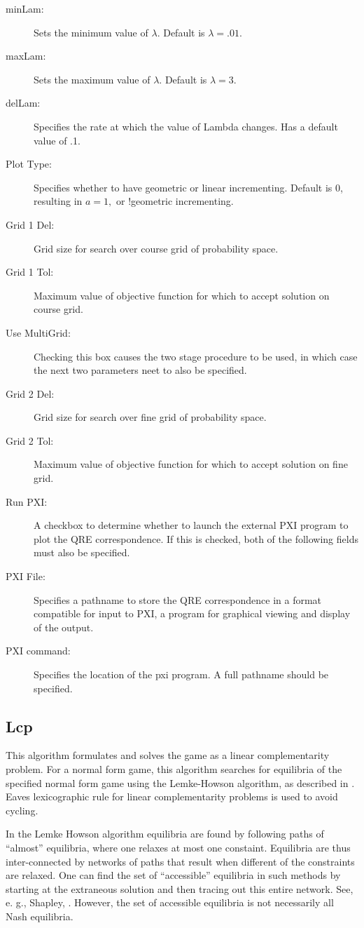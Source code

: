 \begin{description}
\item[minLam:] Sets the minimum value of $\lambda.$
Default is $\lambda = .01.$
\item[maxLam:]  Sets the maximum value of $\lambda.$
Default is $\lambda = 3.$ 
\item[delLam:] Specifies the rate at which the value of Lambda changes.
Has a default value of .1.
\item[Plot Type:] Specifies whether to have geometric or linear incrementing.
Default is 0, resulting in $a = 1,$ or !geometric incrementing.
\item[Grid 1 Del:] Grid size for search over course grid of probability space.
\item[Grid 1 Tol:] Maximum value of objective function for which to accept
solution on course grid.
\item[Use MultiGrid:] Checking this box causes the two stage procedure
to be used, in which case the next two parameters neet to also be
specified.
\item[Grid 2 Del:] Grid size for search over fine grid of probability space.  
\item[Grid 2 Tol:] Maximum value of objective function for which to
accept solution on fine grid.
\item[Run PXI:] A checkbox to determine whether to launch the external
PXI program to plot the QRE correspondence.  If this is checked, both
of the following fields must also be specified.
\item[PXI File:] Specifies a pathname to store the QRE correspondence
in a format compatible for input to PXI, a program for graphical
viewing and display of the output.
\item[PXI command:] Specifies the location of the pxi program.  A full
pathname should be specified.
\end{description}

\subsection{Lcp}\label{Lcp}
This algorithm formulates and solves the game as a linear
complementarity problem.  For a normal form game, this algorithm
searches for equilibria of the specified normal form game using the
Lemke-Howson algorithm, as described in \cite{LemHow:64}. Eaves
\cite{Eav:71} lexicographic rule for linear complementarity problems
is used to avoid cycling.

In the Lemke Howson algorithm equilibria are found by following paths
of ``almost'' equilibria, where one relaxes at most one constaint.
Equilibria are thus inter-connected by networks of paths that result
when different of the constraints are relaxed.  One can find the set
of ``accessible'' equilibria in such methods by starting at the
extraneous solution and then tracing out this entire network.  See,
e. g., Shapley, \cite{Sha:74}.  However, the set of accessible
equilibria is not necessarily all Nash equilibria.

